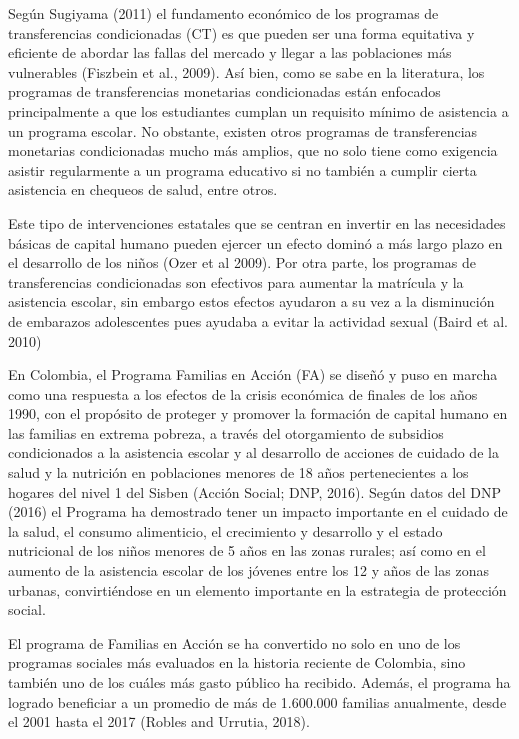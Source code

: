 \documentclass[AER]{AEA}
\begin{document}
Según Sugiyama (2011) el fundamento económico de los programas de transferencias condicionadas (CT) es que pueden ser una forma equitativa y eficiente de abordar las fallas del mercado y llegar a las poblaciones más vulnerables (Fiszbein et al., 2009). Así bien, como se sabe en la literatura, los programas de transferencias monetarias condicionadas están enfocados principalmente a que los estudiantes cumplan un requisito mínimo de asistencia a un programa escolar. No  obstante,  existen  otros  programas  de  transferencias  monetarias  condicionadas mucho  más amplios, que no solo tiene como exigencia asistir regularmente a un programa educativo si no también a cumplir cierta asistencia en chequeos de salud, entre otros.

 Este tipo de intervenciones estatales que se centran en invertir en las necesidades básicas de capital humano pueden ejercer un efecto dominó a más largo plazo en el desarrollo de los niños (Ozer et al 2009). Por otra parte, los programas de transferencias condicionadas son efectivos para aumentar la matrícula y la asistencia escolar, sin embargo estos efectos ayudaron a su vez a la disminución de embarazos adolescentes pues ayudaba a evitar la actividad sexual (Baird et al. 2010)
     
En Colombia, el Programa Familias en Acción (FA) se diseñó y puso en marcha como una respuesta a los efectos de la crisis económica de finales de los años 1990, con el propósito de proteger y promover la formación de capital humano en las familias en extrema pobreza, a través del otorgamiento de subsidios condicionados a la asistencia escolar y al desarrollo de acciones de cuidado de la salud y la nutrición en poblaciones menores de 18 años pertenecientes a los hogares del nivel 1 del Sisben (Acción Social; DNP, 2016). Según datos del DNP (2016) el Programa ha demostrado tener un impacto importante en el cuidado de la salud, el consumo alimenticio, el crecimiento y desarrollo y el estado nutricional de los niños menores de 5 años en las zonas rurales; así como en el aumento de la asistencia escolar de los jóvenes entre los 12 y años de las zonas urbanas, convirtiéndose en un elemento importante en la estrategia de protección social.
     
El programa de Familias en Acción  se ha convertido no solo en uno de los programas sociales más evaluados en la historia reciente de Colombia, sino también uno de los cuáles más gasto público ha recibido. Además, el programa ha logrado beneficiar a un promedio de más de 1.600.000 familias anualmente, desde el 2001 hasta el 2017 (Robles and Urrutia, 2018).
    
\end{document}

